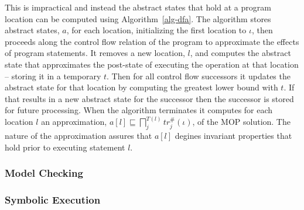This is impractical and instead the abstract states that hold at a
program location can be computed using Algorithm~\ref{alg-dfa}.
The algorithm stores abstract states, $a$, for each location, initializing
the first location to $\iota$, then proceeds along the control
flow relation of the program to approximate the effects of program
statements.  It removes a new location, $l$, and computes the abstract
state that approximates the post-state of executing the operation
at that location -- storing it in a temporary $t$.  Then for
all control flow successors it updates the abstract state for
that location by computing the greatest lower bound with $t$.
If that results in a new abstract state for the successor then
the successor is stored for future processing.  When the algorithm
terminates it computes for each location $l$ an approximation,
$a[l] \sqsubseteq \displaystyle\bigsqcap_j^{T(l)} tr_j^\#(\iota)$, 
of the MOP solution.
The nature of the approximation assures that $a[l]$ degines
invariant properties that hold prior to executing statement $l$.


\subsubsection{Model Checking}

\subsubsection{Symbolic Execution}
\label{sec:back:symexe}


